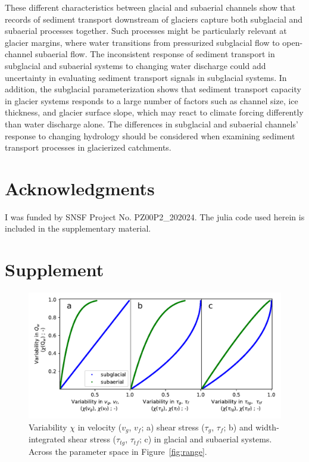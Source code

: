 \documentclass[11pt]{article}
\begin{document}
\begin{spacing}{1}
  These different characteristics between glacial and subaerial channels show that records of sediment transport downstream of glaciers capture both subglacial and subaerial processes together.
  Such processes might be particularly relevant at glacier margins, where water transitions from pressurized subglacial flow to open-channel subaerial flow.
  The inconsistent response of sediment transport in subglacial and subaerial systems to changing water discharge could add uncertainty in evaluating  sediment transport signals in subglacial systems.
  In addition, the subglacial parameterization shows that sediment transport capacity in glacier systems responds to a large number of factors such as channel size, ice thickness, and glacier surface slope, which may react to climate forcing differently than water discharge alone. 
  The differences in subglacial and subaerial channels' response to changing hydrology should be considered when examining sediment transport processes in glacierized catchments.
  
  \section{Acknowledgments}
  
  I was funded by SNSF Project No. PZ00P2\_202024.
  The julia code used herein is included in the supplementary material.
  
  
\end{spacing}





\section{Supplement}

\renewcommand{\figurename}{Figure S}
\setcounter{figure}{0}

\begin{center}
  \begin{figure}[H]
    \includegraphics[width=0.7\linewidth]{multi_run_vars.pdf}
    \caption{Variability $\chi$ in velocity ($v_g$, $v_f$; a) shear stress ($\tau_g$, $\tau_f$; b) and width-integrated shear stress ($\tau_{tg}$, $\tau_{tf}$; c)  in glacial and subaerial systems. Across the parameter space in Figure~\ref{fig:range}. }
    \label{fig:gammas}
  \end{figure}
\end{center}
\end{document}
